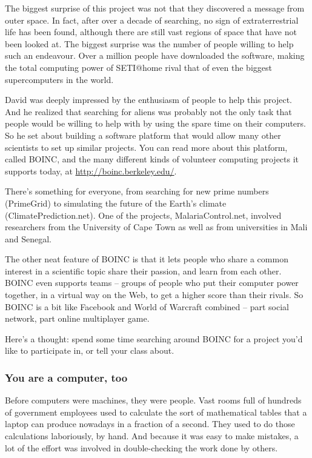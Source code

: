 The biggest surprise of this project was not that they discovered a message from outer space. In fact, after over a decade of searching, no sign of extraterrestrial life has been found, although there are still vast regions of space that have not been looked at. The biggest surprise was the number of people willing to help such an endeavour. Over a million people have downloaded the software, making the total computing power of SETI@home rival that of even the biggest supercomputers in the world.

David was deeply impressed by the enthusiasm of people to help this project. And he realized that searching for aliens was probably not the only task that people would be willing to help with by using the spare time on their computers. So he set about building a software platform that would allow many other scientists to set up similar projects. You can read more about this platform, called BOINC, and the many different kinds of volunteer computing projects it supports today, at \underline{http://boinc.berkeley.edu/}. \par

There’s something for everyone, from searching for new prime numbers (PrimeGrid) to simulating the future of the Earth’s climate (ClimatePrediction.net). One of the projects, MalariaControl.net, involved researchers from the University of Cape Town as well as from universities in Mali and Senegal. \par

The other neat feature of BOINC is that it lets people who share a common interest in a scientific topic share their passion, and learn from each other. BOINC even supports teams – groups of people who put their computer power together, in a virtual way on the Web, to get a higher score than their rivals. So BOINC is a bit like Facebook and World of Warcraft combined – part social network, part online multiplayer game.\par

Here’s a thought: spend some time searching around BOINC for a project you’d like to participate in, or tell your class about. 

\subsubsection{You are a computer, too}
Before computers were machines, they were people. Vast rooms full of hundreds of government employees used to calculate the sort of mathematical tables that a laptop can produce nowadays in a fraction of a second. They used to do those calculations laboriously, by hand. And because it was easy to make mistakes, a lot of the effort was involved in double-checking the work done by others. \par

